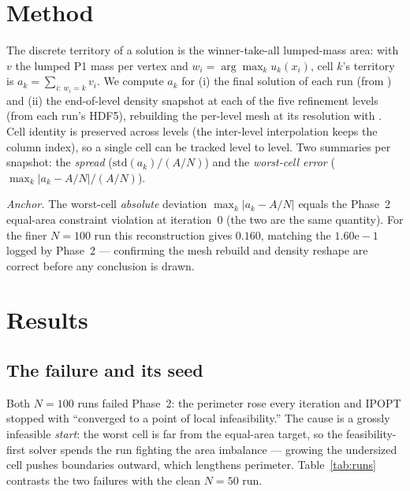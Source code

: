 \documentclass[11pt,a4paper]{article}
\begin{document}
\section{Method}
The discrete territory of a solution is the winner-take-all lumped-mass area:
with \(v\) the lumped P1 mass per vertex and \(w_i=\arg\max_k u_k(x_i)\), cell
\(k\)'s territory is \(a_k=\sum_{i:\,w_i=k} v_i\). We compute \(a_k\) for
(i) the final solution of each run (from ) and (ii) the
end-of-level density snapshot at each of the five refinement levels (from each
run's  HDF5), rebuilding the per-level mesh at its resolution with
. Cell identity is preserved across levels (the
inter-level interpolation keeps the column index), so a single cell can be tracked
level to level. Two summaries per snapshot: the \emph{spread} (\(\mathrm{std}(a_k)/(A/N)\))
and the \emph{worst-cell error} (\(\max_k|a_k-A/N|/(A/N)\)).

\emph{Anchor.} The worst-cell \emph{absolute} deviation \(\max_k|a_k-A/N|\) equals
the Phase~2 equal-area constraint violation at iteration~0 (the two are the same
quantity). For the finer \(N=100\) run this reconstruction gives \(0.160\),
matching the \(1.60\mathrm{e}{-}1\) logged by Phase~2 --- confirming the mesh
rebuild and density reshape are correct before any conclusion is drawn.

\section{Results}

\subsection{The failure and its seed}
\label{sec:failure}
Both \(N=100\) runs failed Phase~2: the perimeter rose every iteration and IPOPT
stopped with ``converged to a point of local infeasibility.'' The cause is a
grossly infeasible \emph{start}: the worst cell is far from the equal-area target,
so the feasibility-first solver spends the run fighting the area imbalance ---
growing the undersized cell pushes boundaries outward, which lengthens perimeter.
Table~\ref{tab:runs} contrasts the two failures with the clean \(N=50\) run.
\end{document}
